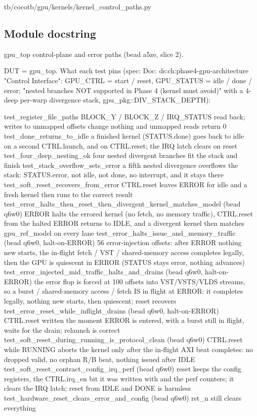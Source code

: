 \begin{relocated}{tb/cocotb/gpu/kernels/kernel_control_paths.py}

\subsection*{Module docstring}

\begin{textblock}
gpu_top control-plane and error paths (bead a5ze, slice 2).

DUT = gpu_top.  What each test pins (spec: Doc: ds:ch:phase4-gpu-architecture "Control Interface":
GPU_CTRL = start / reset, GPU_STATUS = idle / done / error; "nested branches NOT supported in
Phase 4 (kernel must avoid)" with a 4-deep per-warp divergence stack, gpu_pkg::DIV_STACK_DEPTH):

test_register_file_paths      BLOCK_Y / BLOCK_Z / IRQ_STATUS read back; writes to unmapped
offsets change nothing and unmapped reads return 0
test_done_returns_to_idle     a finished kernel (STATUS.done) goes back to idle on a second
CTRL.launch, and on CTRL.reset; the IRQ latch clears on reset
test_four_deep_nesting_ok     four nested divergent branches fit the stack and finish
test_stack_overflow_sets_error   a fifth nested divergence overflows the stack: STATUS.error,
not idle, not done, no interrupt, and it stays there
test_soft_reset_recovers_from_error   CTRL.reset leaves ERROR for idle and a fresh kernel then
runs to the correct result
test_error_halts_then_reset_then_divergent_kernel_matches_model   (bead q6w0) ERROR halts the
errored kernel (no fetch, no memory traffic), CTRL.reset from the
halted ERROR returns to IDLE, and a divergent kernel then
matches gpu_ref_model on every lane
test_error_halts_issue_and_memory_traffic   (bead q6w0, halt-on-ERROR) 56 error-injection
offsets: after ERROR nothing new starts, the in-flight fetch /
VST / shared-memory access completes legally, then the GPU is
quiescent in ERROR (STATUS stays error, nothing advances)
test_error_injected_mid_traffic_halts_and_drains   (bead q6w0, halt-on-ERROR) the error flop is
forced at 100 offsets into VST/VSTS/VLDS streams, so a burst /
shared-memory access / fetch IS in flight at ERROR: it completes
legally, nothing new starts, then quiescent; reset recovers
test_error_reset_while_inflight_drains   (bead q6w0, halt-on-ERROR) CTRL.reset written the
moment ERROR is entered, with a burst still in flight, waits for
the drain; relaunch is correct
test_soft_reset_during_running_is_protocol_clean   (bead q6w0) CTRL.reset while RUNNING aborts
the kernel only after the in-flight AXI beat completes: no
dropped valid, no orphan R/B beat, nothing issued after IDLE
test_soft_reset_contract_config_irq_perf   (bead q6w0) reset keeps the config registers, the
CTRL.irq_en bit it was written with and the perf counters; it
clears the IRQ latch; reset from IDLE and DONE is harmless
test_hardware_reset_clears_error_and_config   (bead q6w0) rst_n still clears everything
\end{textblock}


\end{relocated}
